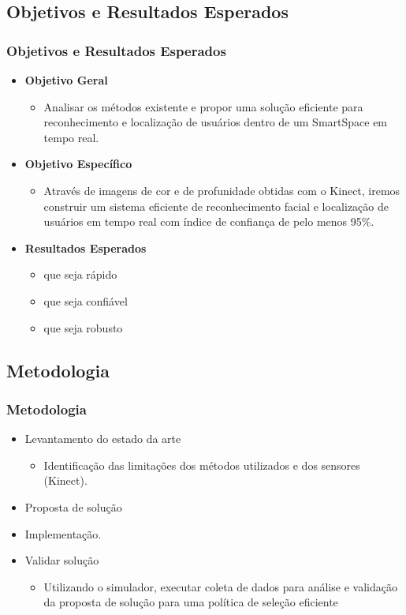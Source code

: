 \documentclass{beamer}
\begin{document}
\subsection{Objetivos e Resultados Esperados}
\begin{frame}
    \frametitle{Objetivos e Resultados Esperados}
    \begin{itemize}
      \item \textbf{Objetivo Geral}
        \begin{itemize}
          \item Analisar os métodos existente e propor uma solução eficiente para reconhecimento e localização de usuários dentro de um SmartSpace em tempo real.
        \end{itemize}
      \item \textbf{Objetivo Específico}
        \begin{itemize}
            \item Através de imagens de cor e de profunidade obtidas com o Kinect, iremos construir um sistema eficiente de reconhecimento facial e localização de usuários em tempo real com índice de confiança de pelo menos 95\%.
        \end{itemize}
      \item \textbf{Resultados Esperados}
        \begin{itemize}
          \item que seja rápido
          \item que seja confiável
          \item que seja robusto
        \end{itemize}
    \end{itemize}
\end{frame}


\subsection{Metodologia}
\begin{frame}
    \frametitle{Metodologia}
    \begin{itemize}
    \pause \item Levantamento do estado da arte
        \begin{itemize}
            \item Identificação das limitações dos métodos utilizados e dos sensores (Kinect).
        \end{itemize}
    \pause \item Proposta de solução
    \pause \item Implementação.
    \pause \item Validar solução
        \begin{itemize}
            \item Utilizando o simulador, executar coleta de dados para análise
                e validação da proposta de solução para uma política de seleção
        eficiente
        \end{itemize}
    \end{itemize}
\end{frame}
\end{document}
